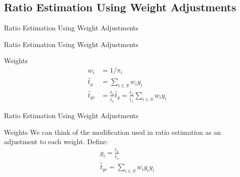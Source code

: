 \documentclass[10pt]{beamer}\usepackage[]{graphicx}\usepackage[]{xcolor}
\makeatletter
\newcommand{\hlnum}[1]{\textcolor[rgb]{0.686,0.059,0.569}{#1}}%
\newcommand{\hlcom}[1]{\textcolor[rgb]{0.678,0.584,0.686}{\textit{#1}}}%
\newcommand{\hlopt}[1]{\textcolor[rgb]{0,0,0}{#1}}%
\newcommand{\hlstd}[1]{\textcolor[rgb]{0.345,0.345,0.345}{#1}}%
\newcommand{\hlkwb}[1]{\textcolor[rgb]{0.69,0.353,0.396}{#1}}%
\newcommand{\hlkwd}[1]{\textcolor[rgb]{0.737,0.353,0.396}{\textbf{#1}}}%
\newenvironment{kframe}{%
 \def\at@end@of@kframe{}%
 \ifinner\ifhmode%
  \def\at@end@of@kframe{\end{minipage}}%
  \begin{minipage}{\columnwidth}%
 \fi\fi%
 \def\FrameCommand##1{\hskip\@totalleftmargin \hskip-\fboxsep
 \colorbox{shadecolor}{##1}\hskip-\fboxsep
     \hskip-\linewidth \hskip-\@totalleftmargin \hskip\columnwidth}%
 \MakeFramed {\advance\hsize-\width
   \@totalleftmargin\z@ \linewidth\hsize
   \@setminipage}}%
 {\par\unskip\endMakeFramed%
 \at@end@of@kframe}
\newenvironment{knitrout}{}{} %
\makeatother
\begin{document}

\subsection{Ratio Estimation Using Weight Adjustments}
\begin{frame}{}
\begin{block}{}
\begin{center}
Ratio Estimation Using Weight Adjustments
\end{center}
\end{block}
\end{frame}

\begin{frame}{Ratio Estimation Using Weight Adjustments}
\begin{block}{Weights}
\begin{align*}
w_i &= 1/\pi_i\\
\hat{t}_y &= \sum_{i \in S} w_i y_i\\
\hat{t}_{yr} &= \frac{t_x}{\hat{t}_x}\hat{t}_y = \frac{t_x}{\hat{t}_x} \sum_{i\in S} w_i y_i
\end{align*}
\end{block}
\end{frame}

\begin{frame}{Ratio Estimation Using Weight Adjustments}
\begin{block}{Weights}
We can think of the modification used in ratio estimation as an adjustment to each weight. Define:
\begin{align*}
g_i = \frac{t_x}{\hat{t}_x} \\
\hat{t}_{yr} = \sum_{i \in S} w_i g_i y_i
\end{align*}
\end{block}
\end{frame}
\end{document}
